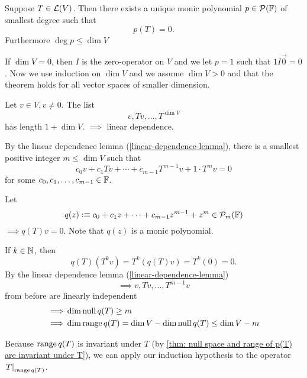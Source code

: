 \begin{thm}
  \label{unique-monic-polynomial-of-smallest-degree}
  Suppose $T\in \mathcal{L}(V)$. Then there exists a unique monic polynomial $p\in \mathcal{P}(\mathbb{F})$ of smallest degree such that 
  \begin{equation}
    p(T)=0. 
  \end{equation}
  Furthermore $\deg p \leq \dim V$
\end{thm}
\begin{prf}
  If $\dim V=0$, then $I$ is the zero-operator on $V$ and we let $p=1$ such that $1I\vec0=0$.           Now we use induction on $\dim V$ and we assume $\dim V > 0$ and that the theorem holds for all vector spaces of smaller dimension.
  
  Let $v\in V, v \neq 0$. The list \begin{equation}
    v, Tv, \dots, T^{\dim V}
  \end{equation}
  has length $1+\dim V.$
  $\implies$ linear dependence.

  By the linear dependence lemma (\ref{linear-dependence-lemma}), there is a smallest positive integer $m\leq \dim V$ such that
  \begin{equation}
    c_0 v + c_1 Tv + \cdots + c_{m-1} T^{m-1} v + 1\cdot T^m v = 0
  \end{equation}
  for some $c_0, c_1, \dots, c_{m-1} \in \mathbb{F}$. 

  Let
  \[ q(z) :\equiv c_0 + c_1z + \cdots + c_{m-1} z^{m-1} +z^{m} \in \mathcal{P}_m (\mathbb{F}) \]
  $\implies q(T) v=0$. Note that $q(z)$ is a monic polynomial.

  If $k \in \mathbb{N}$, then
  \begin{equation}
    q(T)(T^kv)=T^k(q(T)v) =T^k (0) =0.
  \end{equation}
  By the linear dependence lemma (\ref{linear-dependence-lemma}) \begin{equation}
    \implies v, Tv, \dots, T^{m-1}v
  \end{equation}
  from before are linearly independent 
  \begin{equation}
    \begin{aligned}
    \implies &\dim \operatorname{null} q(T)   \geq m \\ 
    \implies &\dim \operatorname{range} q(T)  = \dim V - \dim \operatorname{null} q(T) 
                                \leq \dim V - m
    \end{aligned} 
  \end{equation}
  
  Because $\operatorname{range} q(T)$ is invariant under $T$ (by  \ref{thm: null space and range of p(T) are invariant under T}), we can apply our induction hypothesis to the operator $\left.T\right|_{\operatorname{range} q(T)}$. 
  

\end{prf}
